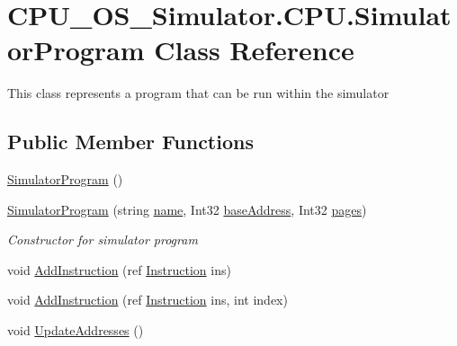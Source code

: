 \hypertarget{class_c_p_u___o_s___simulator_1_1_c_p_u_1_1_simulator_program}{}\section{C\+P\+U\+\_\+\+O\+S\+\_\+\+Simulator.\+C\+P\+U.\+Simulator\+Program Class Reference}
\label{class_c_p_u___o_s___simulator_1_1_c_p_u_1_1_simulator_program}


This class represents a program that can be run within the simulator  


\subsection*{Public Member Functions}
\begin{DoxyCompactItemize}
\item 
\hyperlink{class_c_p_u___o_s___simulator_1_1_c_p_u_1_1_simulator_program_a92873858cd0a0d7e506f5718788a9e5e}{Simulator\+Program} ()
\item 
\hyperlink{class_c_p_u___o_s___simulator_1_1_c_p_u_1_1_simulator_program_af30bc76187c64b374a48d6d7f9e94d54}{Simulator\+Program} (string \hyperlink{class_c_p_u___o_s___simulator_1_1_c_p_u_1_1_simulator_program_ad4797b5d81ceb01cd4207a97b7af36c5}{name}, Int32 \hyperlink{class_c_p_u___o_s___simulator_1_1_c_p_u_1_1_simulator_program_aaea4fb02fb8d22806ce58b957f9b573d}{base\+Address}, Int32 \hyperlink{class_c_p_u___o_s___simulator_1_1_c_p_u_1_1_simulator_program_ac4d19d17c7ee206ad6343884f3390054}{pages})
\begin{DoxyCompactList}\small\item\em Constructor for simulator program \end{DoxyCompactList}\item 
void \hyperlink{class_c_p_u___o_s___simulator_1_1_c_p_u_1_1_simulator_program_a6b6df3400e406b1dc6de3787f1a8fc61}{Add\+Instruction} (ref \hyperlink{class_c_p_u___o_s___simulator_1_1_c_p_u_1_1_instruction}{Instruction} ins)
\item 
void \hyperlink{class_c_p_u___o_s___simulator_1_1_c_p_u_1_1_simulator_program_a1142bf081f4173d0276504db3d232968}{Add\+Instruction} (ref \hyperlink{class_c_p_u___o_s___simulator_1_1_c_p_u_1_1_instruction}{Instruction} ins, int index)
\item 
void \hyperlink{class_c_p_u___o_s___simulator_1_1_c_p_u_1_1_simulator_program_a4f7e933d4f3ca318d68471d465c6b31c}{Update\+Addresses} ()
\end{DoxyCompactItemize}
